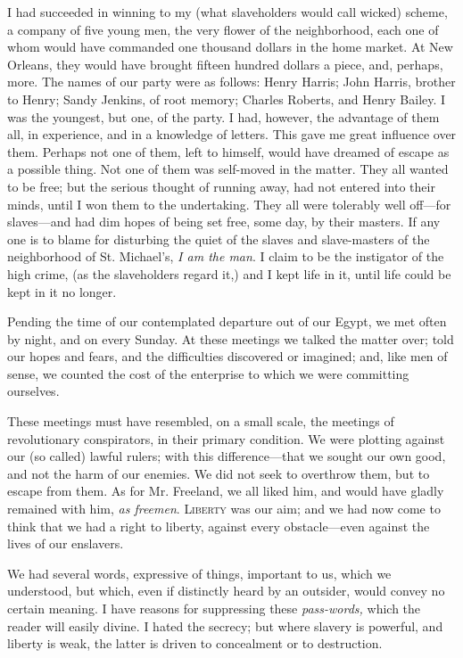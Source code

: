 I had succeeded in winning to my (what slaveholders would call wicked)
scheme, a company of five young men, the very flower of the
neighborhood, each one of whom would have commanded one thousand dollars
in the home market. At New Orleans, they would have brought fifteen
hundred dollars a piece, and, perhaps, more. The names of our party were
as follows: Henry Harris; John Harris, brother to Henry; Sandy Jenkins,
of root memory; Charles Roberts, and Henry Bailey. I was the youngest,
but one, of the party. I had, however, the advantage of them all, in
experience, and in a knowledge of letters. This gave me great influence
over them. Perhaps not one of them, left to himself, would have dreamed
of escape as a possible thing. Not one of them was self-moved in the
matter. They all wanted to be free; but the serious thought of running
away, had not entered into their minds, until I won them to the
undertaking. They all were tolerably well off---for slaves---and had dim
hopes of being set free, some day, by their masters. If any one is to
blame for disturbing the quiet of the slaves and slave-masters of the
neighborhood of St. Michael's, \emph{I am the man}. {}I claim to be the
instigator of the high crime, (as the slaveholders regard it,) and I
kept life in it, until life could be kept in it no longer.

Pending the time of our contemplated departure out of our Egypt, we met
often by night, and on every Sunday. At these meetings we talked the
matter over; told our hopes and fears, and the difficulties discovered
or imagined; and, like men of sense, we counted the cost of the
enterprise to which we were committing ourselves.

These meetings must have resembled, on a small scale, the meetings of
revolutionary conspirators, in their primary condition. We were plotting
against our (so called) lawful rulers; with this difference---that we
sought our own good, and not the harm of our enemies. We did not seek to
overthrow them, but to escape from them. As for Mr. Freeland, we all
liked him, and would have gladly remained with him, \emph{as freemen}.
\textsc{Liberty} was our aim; and we had now come to think that we had a
right to liberty, against every obstacle---even against the lives of our
enslavers.

We had several words, expressive of things, important to us, which we
understood, but which, even if distinctly heard by an outsider, would
convey no certain meaning. I have reasons for suppressing these
\emph{pass-words,} which the reader will easily divine. I hated the
secrecy; but where slavery is powerful, and liberty is weak, the latter
is driven to concealment or to destruction.

